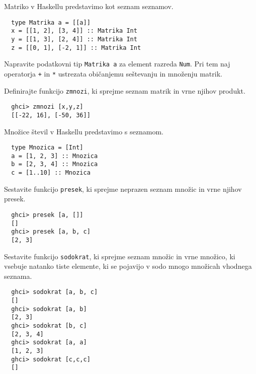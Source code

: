 \documentclass[arhiv]{../izpit}
\begin{document}


Matriko v Haskellu predstavimo kot seznam seznamov.

\begin{verbatim}
  type Matrika a = [[a]]
  x = [[1, 2], [3, 4]] :: Matrika Int
  y = [[1, 3], [2, 4]] :: Matrika Int
  z = [[0, 1], [-2, 1]] :: Matrika Int
\end{verbatim}

\podnaloga
  Napravite podatkovni tip \texttt{Matrika a} za element razreda \texttt{Num}.
  Pri tem naj operatorja \texttt{+} in \texttt{*} ustrezata običanjemu seštevanju
  in množenju matrik.

\podnaloga
  Definirajte funkcijo \texttt{zmnozi}, ki sprejme seznam matrik in vrne
  njihov produkt.
  \begin{verbatim}
  ghci> zmnozi [x,y,z]
  [[-22, 16], [-50, 36]]
  \end{verbatim}



Množice števil v Haskellu predstavimo s seznamom.

\begin{verbatim}
  type Mnozica = [Int]
  a = [1, 2, 3] :: Mnozica
  b = [2, 3, 4] :: Mnozica
  c = [1..10] :: Mnozica
\end{verbatim}

\podnaloga
  Sestavite funkcijo \texttt{presek}, ki sprejme neprazen seznam množic
  in vrne njihov presek.

  \begin{verbatim}
  ghci> presek [a, []]
  []
  ghci> presek [a, b, c]
  [2, 3]
  \end{verbatim}

\podnaloga
  Sestavite funkcijo \texttt{sodokrat}, ki sprejme seznam množic in vrne
  množico, ki vsebuje natanko tiste elemente, ki se pojavijo v sodo mnogo
  množicah vhodnega seznama.

  \begin{verbatim}
  ghci> sodokrat [a, b, c]
  []
  ghci> sodokrat [a, b]
  [2, 3]
  ghci> sodokrat [b, c]
  [2, 3, 4]
  ghci> sodokrat [a, a]
  [1, 2, 3]
  ghci> sodokrat [c,c,c]
  []
  \end{verbatim}
\end{document}
